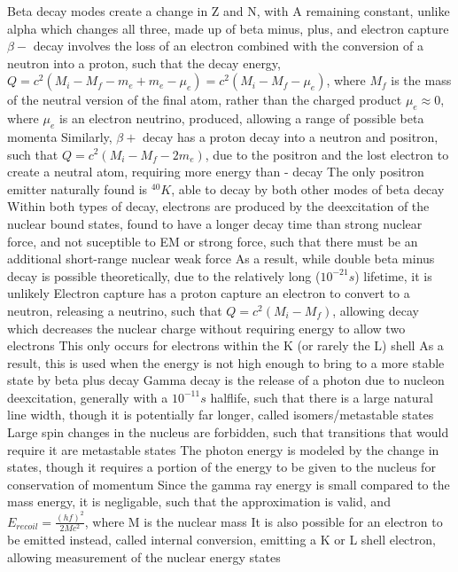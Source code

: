 \documentclass[11 pt, twoside]{article}
\newenvironment{outline*}
{
	\begin{outline}[enumerate]
	}
	{\end{outline}
}
\begin{document}
\begin{outline*}
	\2 Beta decay modes create a change in Z and N, with A remaining constant, unlike alpha which changes all three, made up of beta minus, plus, and electron capture
		\3 $\beta -$ decay involves the loss of an electron combined with the conversion of a neutron into a proton, such that the decay energy, $Q = c^2(M_i - M_f - m_e + m_e - \mu_e) = c^2(M_i - M_f - \mu_e)$, where $M_f$ is the mass of the neutral version of the final atom, rather than the charged product
			\4 $\mu_e \approx 0$, where $\mu_e$ is an electron neutrino, produced, allowing a range of possible beta momenta
		\3 Similarly, $\beta +$ decay has a proton decay into a neutron and positron, such that $Q = c^2(M_i - M_f - 2m_e)$, due to the positron and the lost electron to create a neutral atom, requiring more energy than - decay
			\4 The only positron emitter naturally found is $^{40}K$, able to decay by both other modes of beta decay
		\3 Within both types of decay, electrons are produced by the deexcitation of the nuclear bound states, found to have a longer decay time than strong nuclear force, and not suceptible to EM or strong force, such that there must be an additional short-range nuclear weak force
			\4 As a result, while double beta minus decay is possible theoretically, due to the relatively long ($10^{-21} s$) lifetime, it is unlikely
		\3 Electron capture has a proton capture an electron to convert to a neutron, releasing a neutrino, such that $Q = c^2(M_i - M_f)$, allowing decay which decreases the nuclear charge without requiring energy to allow two electrons
			\4 This only occurs for electrons within the K (or rarely the L) shell
			\4 As a result, this is used when the energy is not high enough to bring to a more stable state by beta plus decay
	\2 Gamma decay is the release of a photon due to nucleon deexcitation, generally with a $10^{-11} s$ halflife, such that there is a large natural line width, though it is potentially far longer, called isomers/metastable states
		\3 Large spin changes in the nucleus are forbidden, such that transitions that would require it are metastable states
		\3 The photon energy is modeled by the change in states, though it requires a portion of the energy to be given to the nucleus for conservation of momentum
			\4 Since the gamma ray energy is small compared to the mass energy, it is negligable, such that the approximation is valid, and $E_{recoil} = \frac{(hf)^2}{2Mc^2}$, where M is the nuclear mass
		\3 It is also possible for an electron to be emitted instead, called internal conversion, emitting a K or L shell electron, allowing measurement of the nuclear energy states

\end{outline*}
\end{document}
